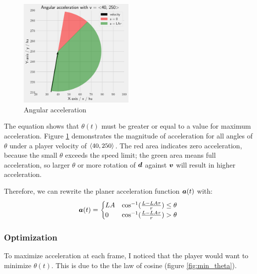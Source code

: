 \begin{figure}[H]
    \centering
    \includegraphics[width=0.5\textwidth]{assets/angular_acceleration_limiting.png}
    \caption{Angular acceleration}
    \label{fig:angular_acceleration_limiting}
\end{figure}

The equation shows that $\theta(t)$ must be greater or equal to a value for maximum acceleration. Figure \ref{fig:angular_acceleration_limiting} demonstrates the magnitude of acceleration for all angles of $\theta$ under a player velocity of $\left\langle 40, 250 \right\rangle$. The red area indicates zero acceleration, because the small $\theta$ exceeds the speed limit; the green area means full acceleration, so larger $\theta$ or more rotation of $\boldsymbol{d}$ against $\boldsymbol{v}$ will result in higher acceleration.

Therefore, we can rewrite the planer acceleration function $\boldsymbol{a}(t)$ with:
\[
\boldsymbol{a}(t) = \begin{cases}
    LA & \cos^{-1}(\frac{L - LA\tau}{r}) \leq \theta\\
    0 & \cos^{-1}(\frac{L - LA\tau}{r}) > \theta
\end{cases}
\]


\subsubsection{Optimization}
To maximize acceleration at each frame, I noticed that the player would want to minimize $\theta(t)$. This is due to the the law of cosine (figure \ref{fig:min_theta}).

